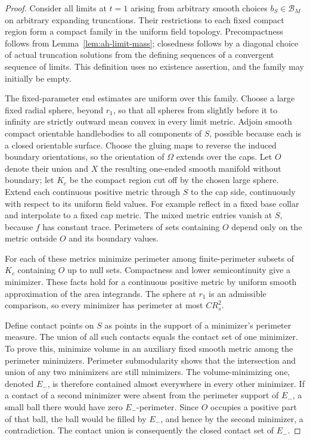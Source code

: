 \begin{proof}
Consider all limits at \(t=1\) arising from arbitrary smooth
choices \(b_S\in\mathcal B_M\) on arbitrary expanding
truncations.  Their restrictions to each fixed compact
region form a compact family in the uniform field topology.
Precompactness follows from Lemma~\ref{lem:ah-limit-mass};
closedness follows by a diagonal choice of actual truncation
solutions from the defining sequences of a convergent
sequence of limits.  This definition uses no existence
assertion, and the family may initially be empty.

The fixed-parameter end estimates are uniform over this
family.  Choose a large fixed radial sphere, beyond \(r_1\),
so that all spheres from slightly before it to infinity are
strictly outward mean convex in every limit metric.
Adjoin smooth compact orientable handlebodies to all components of
\(S\), possible because each is a closed orientable surface.  Choose
the gluing maps to reverse the induced boundary orientations, so the
orientation of \(\Omega\) extends over the caps.
Let \(O\) denote their union and \(X\) the resulting
one-ended smooth manifold without boundary; let \(K_c\)
be the compact region cut off by the chosen large sphere.
Extend each continuous positive metric through \(S\) to
the cap side, continuously with respect to its uniform
field values.  For example reflect in a fixed base collar
and interpolate to a fixed cap metric.  The mixed metric
entries vanish at \(S\), because \(f\) has constant trace.
Perimeters of sets containing \(O\) depend only on the
metric outside \(O\) and its boundary values.

For each of these metrics minimize perimeter among
finite-perimeter subsets of \(K_c\) containing \(O\)
up to null sets.  Compactness and lower semicontinuity
give a minimizer.  These facts hold for a continuous
positive metric by uniform smooth approximation of the
area integrands.  The sphere at \(r_1\) is an admissible
comparison, so every minimizer has perimeter at most
\(CR_s^2\).

Define contact points on \(S\) as points in the support
of a minimizer's perimeter measure.  The union of all
such contacts equals the contact set of one minimizer.
To prove this, minimize volume in an auxiliary fixed
smooth metric among the perimeter minimizers.  Perimeter
submodularity shows that the intersection and union of
any two minimizers are still minimizers.  The
volume-minimizing one, denoted \(E_-\), is therefore
contained almost everywhere in every other minimizer.
If a contact of a second minimizer were absent from the
perimeter support of \(E_-\), a small ball there would
have zero \(E_-\)-perimeter.  Since \(O\) occupies a
positive part of that ball, the ball would be filled
by \(E_-\), and hence by the second minimizer, a
contradiction.  The contact union is consequently the
closed contact set of \(E_-\).


\end{proof}
